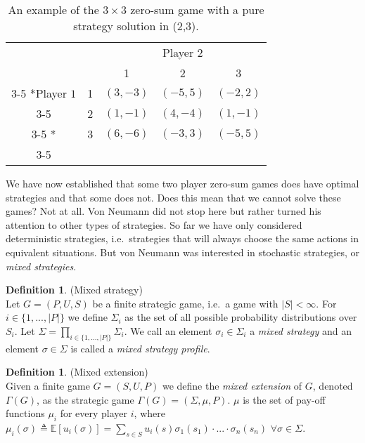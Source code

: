 \documentclass{article}
\theoremstyle{definition}
\newtheorem{definition}[theorem]{Definition}
\theoremstyle{remark}
\begin{document}
\begin{table}[h!]
  \begin{center}
    \setlength{\extrarowheight}{2pt}
    \begin{tabular}{cc|c|c|c|}
      & \multicolumn{2}{c}{} & \multicolumn{1}{c}{Player $2$} & \multicolumn{1}{c}{}\\
      & \multicolumn{1}{c}{} & \multicolumn{1}{c}{1}  &
                                                          \multicolumn{1}{c}{2} & \multicolumn{1}{c}{3} \\\cline{3-5}
      \multirow{2}*{Player $1$}  & 1 & $(3,-3)$ & $(-5,5)$ & $(-2,2)$\\\cline{3-5}
      & 2 & $(1,-1)$ & $(4,-4)$ & $(1,-1)$\\\cline{3-5}
           \multirow{1}*{}  & 3 & $(6,-6)$ & $(-3,3)$ & $(-5,5)$\\\cline{3-5}   \end{tabular}
    \caption{An example of the $3\times 3$ zero-sum game with a pure
      strategy solution in (2,3).}
    \label{value game}
    \end{center}
  \end{table}

We have now established that some two player zero-sum games does have
optimal strategies and that some does not. Does this mean that we
cannot solve these games? Not at all. Von Neumann did not stop here
but rather turned his attention to other types of strategies. So far
we have only considered deterministic strategies, i.e.\ strategies
that will always choose the same actions in equivalent situations. But
von Neumann was interested in stochastic strategies, or \emph{mixed
  strategies}.

\begin{definition}(Mixed strategy)\label{mixed strategy}\\
  Let $G = (P,U,S)$ be a finite strategic game, i.e.\ a game with $|S|
  < \infty $. For $i \in \{1,...,|P|\}$ we define $\Sigma_i$ as the set
  of all possible probability distributions over $S_i$. Let
  $\Sigma = \prod_{i \in \{1,...,|P| \}} \Sigma_i$. We call an element
    $\sigma_i \in \Sigma_i$ a \emph{mixed strategy} and
  an element $\sigma \in \Sigma$ is called a \emph{mixed strategy
    profile}. \citep{Gonzalez-Diaz2010}
  \end{definition}


  \begin{definition}(Mixed extension)\label{Mixed extension}\\
Given a finite game $G = (S,U,P)$ we define the \emph{mixed
  extension} of $G$, denoted $\Gamma(G)$, as the strategic game
$\Gamma(G) = (\Sigma,\mu,P)$. $\mu$ is the set
of pay-off functions $\mu_i$ for every player $i$, where $\mu _i(\sigma) \triangleq \mathbb{E}[u_i(\sigma
  )] =\sum_{s\in S} u_i(s)\sigma_1(s_1) \cdot...\cdot \sigma_n(s_n)$ $\forall
\sigma \in \Sigma$. \citep{Gonzalez-Diaz2010}\\ 
\end{definition}
\end{document}
